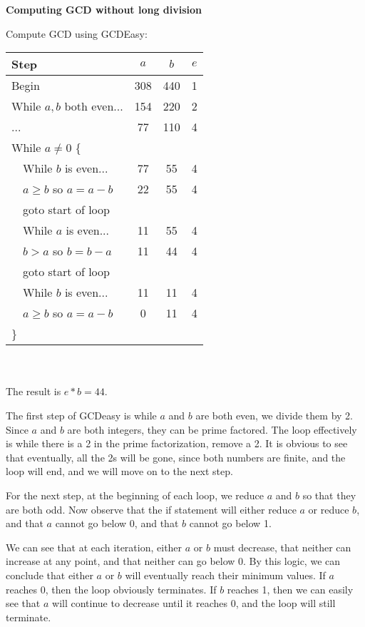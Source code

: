 \documentclass[12pt]{article}
\begin{document}
\begin{list}{.}{}
\begin{list}{)}{}
\end{list}

\newpage
\item \textbf{Computing GCD without long division}
\begin{list}{)}{}

\item Compute GCD using GCDEasy: \\
\begin{tabular}{|l|c|c|c|}
\hline
Step & $a$ & $b$ & $e$ \\
\hline
Begin & 308 & 440 & 1\\
While $a,b$ both even... & 154 & 220 & 2\\
... & 77 & 110 & 4\\
While $a \neq 0$ \{ & & & \\
\ \ While $b$ is even... & 77 & 55 & 4\\
\ \ $a \ge b$ so $a = a-b$ & 22 & 55 & 4\\
\ \ goto start of loop & & & \\
\ \ While $a$ is even... & 11 & 55 & 4\\
\ \ $b > a$ so $b = b-a$ & 11 & 44 & 4\\
\ \ goto start of loop & & & \\
\ \ While $b$ is even... & 11 & 11 & 4\\
\ \ $a \ge b$ so $a = a-b$ & 0 & 11 & 4\\
\} & & & \\
\hline
\end{tabular}\\
\\
The result is $e*b = 44$.

\item The first step of GCDeasy is while $a$ and $b$ are both even, we divide
them by 2.  Since $a$ and $b$ are both integers, they can be prime factored.
The loop effectively is while there is a 2 in the prime factorization, remove a
2.  It is obvious to see that eventually, all the 2s will be gone, since both
numbers are finite, and the loop will end, and we will move on to the next
step.

For the next step, at the beginning of each loop, we reduce $a$ and $b$ so that
they are both odd.  Now observe that the if statement will either reduce $a$ or
reduce $b$, and that $a$ cannot go below 0, and that $b$ cannot go below 1.

We can see that at each iteration, either $a$ or $b$ must decrease, that
neither can increase at any point, and that neither can go below 0.  By this
logic, we can conclude that either $a$ or $b$ will eventually reach their
minimum values.  If $a$ reaches 0, then the loop obviously terminates.  If $b$
reaches 1, then we can easily see that $a$ will continue to decrease until it
reaches 0, and the loop will still terminate.


\end{list}
\end{list}
\end{document}
